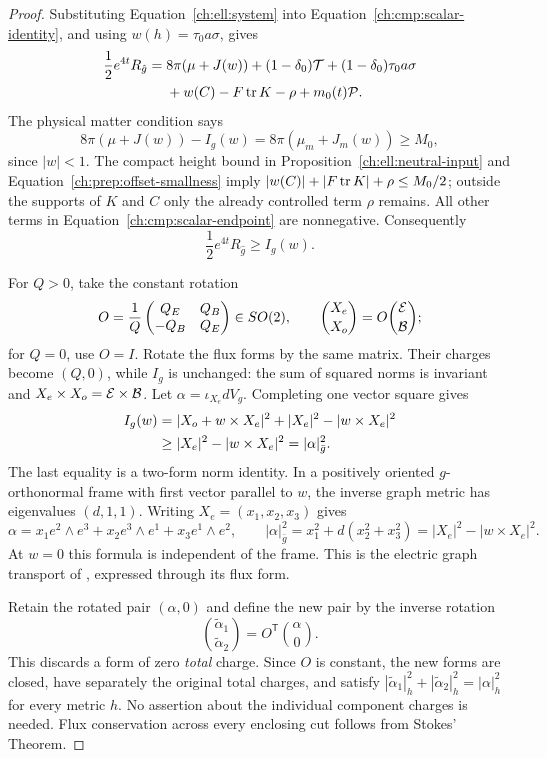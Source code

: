 \begin{proof}
Substituting Equation~\eqref{ch:ell:system} into
Equation~\eqref{ch:cmp:scalar-identity}, and using $w(h)=\tau_0a\sigma$, gives
\begin{align}
 \frac12e^{4t}R_{\hat g}
 ={}&8\pi(\mu+J(w))+(1-\delta_0)\mathcal T
            +(1-\delta_0)\tau_0a\sigma\notag\\
    &+w(C)-F\operatorname{tr} K-\rho+m_0(t)\mathcal P.\label{ch:cmp:scalar-endpoint}
\end{align}
The physical matter condition says
\[
 8\pi(\mu+J(w))-I_g(w)
 =8\pi(\mu_m+J_m(w))\ge M_0,
\]
since $|w|<1$.  The compact height bound in Proposition~\ref{ch:ell:neutral-input} and
Equation~\eqref{ch:prep:offset-smallness} imply
$|w(C)|+|F\operatorname{tr} K|+\rho\le M_0/2$; outside the supports of $K$ and $C$
only the already controlled term $\rho$ remains.
All other terms in Equation~\eqref{ch:cmp:scalar-endpoint} are nonnegative.
Consequently
\begin{equation}\label{ch:cmp:physical-scalar-bound}
 \frac12e^{4t}R_{\hat g}\ge I_g(w).
\end{equation}

For $Q>0$, take the constant rotation
\[
 O=\frac1Q\begin{pmatrix}Q_E&Q_B\\-Q_B&Q_E\end{pmatrix}\in SO(2),
 \qquad \binom{X_e}{X_o}=O\binom{\mathcal E}{\mathcal B};
\]
for $Q=0$, use $O=I$.  Rotate the flux forms by the same matrix.
Their charges become $(Q,0)$, while $I_g$ is unchanged: the sum of
squared norms is invariant and $X_e\times X_o=\mathcal E\times\mathcal B$.
Let $\alpha=\iota_{X_e}dV_g$.  Completing one vector square gives
\begin{align}
 I_g(w)&=|X_o+w\times X_e|^2+|X_e|^2-|w\times X_e|^2\notag\\
       &\ge|X_e|^2-|w\times X_e|^2
         =|\alpha|_{\bar g}^2.\label{ch:cmp:field-square}
\end{align}
The last equality is a two-form norm identity.
In a positively oriented $g$-orthonormal frame with first vector
parallel to $w$, the inverse graph metric has eigenvalues $(d,1,1)$.
Writing $X_e=(x_1,x_2,x_3)$ gives
\[
 \alpha=x_1 e^2\wedge e^3+x_2 e^3\wedge e^1+x_3 e^1\wedge e^2,
 \qquad
 |\alpha|_{\bar g}^2=x_1^2+d(x_2^2+x_3^2)
                       =|X_e|^2-|w\times X_e|^2.
\]
At $w=0$ this formula is independent of the frame.
This is the electric graph transport of \cite[Section~2 and Appendix~A]{DisconziKhuri2012},
expressed through its flux form.

Retain the rotated pair $(\alpha,0)$ and define the new pair by the inverse
rotation
\begin{equation}\label{ch:cmp:new-flux-forms}
 \binom{\widetilde\alpha_1}{\widetilde\alpha_2}
           =O^{\mathsf T}\binom{\alpha}{0}.
\end{equation}
This discards a form of zero \emph{total} charge.  Since $O$ is constant,
the new forms are closed, have separately the original total charges,
and satisfy $|\widetilde\alpha_1|_h^2+|\widetilde\alpha_2|_h^2=|\alpha|_h^2$
for every metric $h$.
No assertion about the individual component charges is needed.
Flux conservation across every enclosing cut follows from Stokes' Theorem.


\end{proof}
